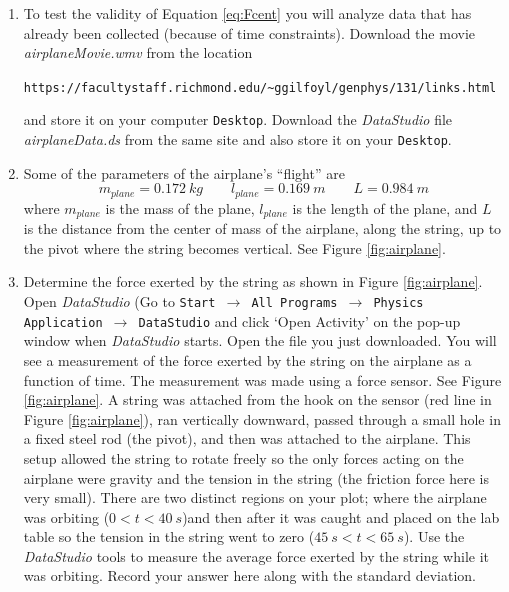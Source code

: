 \begin{enumerate}

\item To test the validity of Equation \ref{eq:Fcent} you will analyze data that has already been collected
(because of time constraints).
Download the movie {\it airplaneMovie.wmv} from the location\raggedright

{\verb!https://facultystaff.richmond.edu/~ggilfoyl/genphys/131/links.html!}

\noindent and store it on your computer {\tt Desktop}.
Download the {\it DataStudio} file {\it airplaneData.ds} from the same site and also store it on your {\tt Desktop}.

\item Some of the parameters of the airplane's ``flight'' are
\[
m_{plane} = 0.172~kg \qquad l_{plane} = 0.169~m \qquad L = 0.984~m
\]
where $m_{plane}$ is the mass of the plane, $l_{plane}$ is the length of the plane, and $L$
is the distance from the center of mass of the airplane, along the string, up to the pivot where
the string becomes vertical. See Figure \ref{fig:airplane}.

\item Determine the force exerted by the string as shown in Figure \ref{fig:airplane}.
Open {\it DataStudio} (Go to {\tt Start $\rightarrow$ All Programs $\rightarrow$ Physics  Application $\rightarrow$ DataStudio} 
and click `Open Activity' on the pop-up window when {\it DataStudio} starts.
Open the file you just downloaded.
You will see a measurement of the force exerted by the string on the airplane as a function of time.
The measurement was made using a force sensor.
See Figure \ref{fig:airplane}.
A string was attached from the hook on the sensor (red line in Figure \ref{fig:airplane}), ran vertically downward, passed through 
a small hole in a fixed steel rod (the pivot), and then was attached to the airplane.
This setup allowed the string to rotate freely so the only forces acting on the airplane were
gravity and the tension in the string (the friction force here is very small).
There are two distinct regions on your plot; where the airplane was orbiting ($0 < t < 40~s$)and then after it was caught
and placed on the lab table so the tension in the string went to zero ($45~s < t < 65~s$).
Use the {\it DataStudio} tools to measure the average force exerted by the string while it was orbiting.
Record your answer here along with the standard deviation.\label{getFscale}\\
\vspace{2mm}


\end{enumerate}
